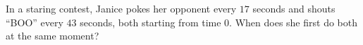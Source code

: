 In a staring contest, Janice pokes her opponent every $17$ seconds and shouts ``BOO'' every $43$ seconds, both starting from time $0$. When does she first do both at the same moment?
